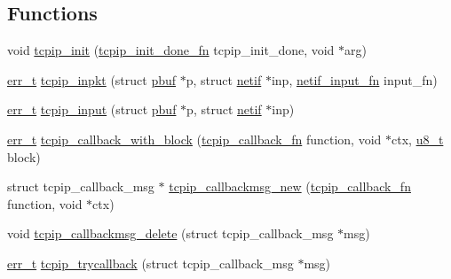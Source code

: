 \subsection*{Functions}
\begin{DoxyCompactItemize}
\item 
void \hyperlink{group__lwip__os_ga1f3a88b8df6ba3b9ed1c00e0a305e3db}{tcpip\+\_\+init} (\hyperlink{openmote-cc2538_2lwip_2src_2include_2lwip_2tcpip_8h_a5fe07216c441e27c3028bcac60fa0992}{tcpip\+\_\+init\+\_\+done\+\_\+fn} tcpip\+\_\+init\+\_\+done, void $\ast$arg)
\item 
\hyperlink{group__infrastructure__errors_gaf02d9da80fd66b4f986d2c53d7231ddb}{err\+\_\+t} \hyperlink{openmote-cc2538_2lwip_2src_2include_2lwip_2tcpip_8h_a93043b3c66dbe4a15a60299c6199d102}{tcpip\+\_\+inpkt} (struct \hyperlink{structpbuf}{pbuf} $\ast$p, struct \hyperlink{structnetif}{netif} $\ast$inp, \hyperlink{openmote-cc2538_2lwip_2src_2include_2lwip_2netif_8h_ab2302b1b64ac7b95f24c6bab754a575e}{netif\+\_\+input\+\_\+fn} input\+\_\+fn)
\item 
\hyperlink{group__infrastructure__errors_gaf02d9da80fd66b4f986d2c53d7231ddb}{err\+\_\+t} \hyperlink{group__lwip__os_gae510f195171bed8499ae94e264a92717}{tcpip\+\_\+input} (struct \hyperlink{structpbuf}{pbuf} $\ast$p, struct \hyperlink{structnetif}{netif} $\ast$inp)
\item 
\hyperlink{group__infrastructure__errors_gaf02d9da80fd66b4f986d2c53d7231ddb}{err\+\_\+t} \hyperlink{openmote-cc2538_2lwip_2src_2include_2lwip_2tcpip_8h_ab1d3ef23817d7703fa75ed67bd45ea1d}{tcpip\+\_\+callback\+\_\+with\+\_\+block} (\hyperlink{openmote-cc2538_2lwip_2src_2include_2lwip_2tcpip_8h_a35203296bb838f3b493839ffc6e7285d}{tcpip\+\_\+callback\+\_\+fn} function, void $\ast$ctx, \hyperlink{group__compiler__abstraction_ga4caecabca98b43919dd11be1c0d4cd8e}{u8\+\_\+t} block)
\item 
struct tcpip\+\_\+callback\+\_\+msg $\ast$ \hyperlink{openmote-cc2538_2lwip_2src_2include_2lwip_2tcpip_8h_aee14fa2587a9ba9d23e4c7e16c4526ac}{tcpip\+\_\+callbackmsg\+\_\+new} (\hyperlink{openmote-cc2538_2lwip_2src_2include_2lwip_2tcpip_8h_a35203296bb838f3b493839ffc6e7285d}{tcpip\+\_\+callback\+\_\+fn} function, void $\ast$ctx)
\item 
void \hyperlink{openmote-cc2538_2lwip_2src_2include_2lwip_2tcpip_8h_ac5b7a59f4c3f5f721ab9ee81f231c9fd}{tcpip\+\_\+callbackmsg\+\_\+delete} (struct tcpip\+\_\+callback\+\_\+msg $\ast$msg)
\item 
\hyperlink{group__infrastructure__errors_gaf02d9da80fd66b4f986d2c53d7231ddb}{err\+\_\+t} \hyperlink{openmote-cc2538_2lwip_2src_2include_2lwip_2tcpip_8h_acfc81ad493f68714a22b3b8ea7d04378}{tcpip\+\_\+trycallback} (struct tcpip\+\_\+callback\+\_\+msg $\ast$msg)

\end{DoxyCompactItemize}
